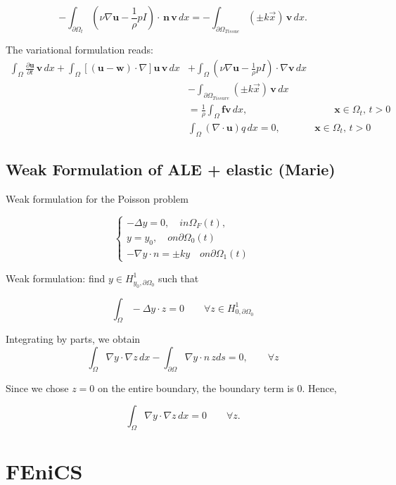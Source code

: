 \documentclass[11pt,a4paper,titlepage]{report}
\begin{document}
\[
- \int_{\partial \Omega_t} (\nu \nabla \mathbf{u} - \frac{1}{\rho} p I) \cdot \, \mathbf{n} \, \mathbf{v} \, dx = - \int_{\partial \Omega_{Tissue}} (\pm k \vec{x}) \, \mathbf{v} \, dx.
\]


The variational formulation reads:
\[
\begin{aligned}
\int_{\Omega} \frac{\partial \mathbf{u}}{\partial t} \, \mathbf{v} \, dx
+ \int_{\Omega} [(\mathbf{u - w}) \cdot \nabla] \mathbf{u} \, \mathbf{v} \, dx
& + \int_{\Omega} (\nu \nabla \mathbf{u} -  \frac{1}{\rho}  pI) \cdot \nabla \mathbf{v} \, dx \\
& - \int_{\partial \Omega_{Tissure}} (\pm k \vec{x}) \, \mathbf{v} \, dx \\
& =  \frac{1}{\rho} \int_{\Omega} \mathbf{f} \mathbf{v} \, dx,  & \qquad \mathbf{x} \in \Omega_t, \, t>0 \\
& \int_{\Omega} ( \nabla \cdot \mathbf{u} ) q \, dx = 0 , \qquad & \mathbf{x} \in \Omega_t, \, t>0
\end{aligned}
\]


\subsection{Weak Formulation of ALE + elastic (Marie)}
Weak formulation for the Poisson problem

\[
\left\{
\begin{aligned}
-\Delta y = 0, \quad in \Omega_F (t), \\
y = y_0,  \quad on \partial \Omega_0 (t) \\
- \nabla y \cdot n = \pm ky \quad on \partial \Omega_1 (t)
\end{aligned}
\right.
\]

Weak formulation: find $y \in H^1_{y_0, \partial \Omega_0}$ such that

\[
\int_\Omega -\Delta y \cdot z = 0 \qquad \forall z \in H^1_{0, \partial \Omega_0}
\]

Integrating by parts, we obtain
\[
\int_\Omega \nabla y \cdot \nabla z \,  dx - \int_{\partial \Omega} \nabla y \cdot n \, z ds = 0, \qquad \forall z
\]

Since we chose $z = 0$ on the entire boundary, the boundary term is 0. Hence,

\[
\int_\Omega \nabla y \cdot \nabla z  \,  dx = 0 \qquad \forall z.
\]







\section{FEniCS}
\end{document}
